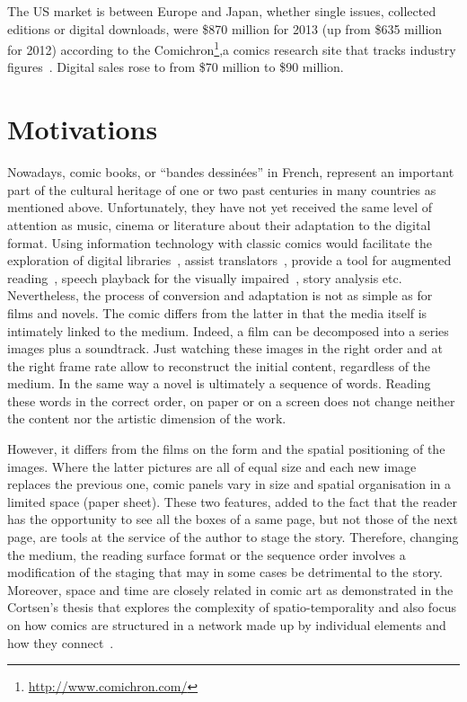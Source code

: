 The US market is between Europe and Japan, whether single issues, collected editions or digital downloads, were \$870 million for 2013 (up from \$635 million for 2012) according to the Comichron\footnote{\url{http://www.comichron.com/}},a comics research site that tracks industry figures~\cite{Miller2014}.
Digital sales rose to from \$70 million to \$90 million.

\section{Motivations} %
\label{ssub:motivations}

Nowadays, comic books, or ``bandes dessin{\'e}es'' in French, represent an important part of the cultural heritage of one or two past centuries in many countries as mentioned above.
Unfortunately, they have not yet received the same level of attention as music, cinema or literature about their adaptation to the digital format.
Using information technology with classic comics would facilitate the exploration of digital libraries~\cite{Back2001}, assist translators~\cite{borodo2014multimodality}, provide a tool for augmented reading~\cite{Singh2004,Raulet2013Comics}, speech playback for the visually impaired~\cite{Brandon2014,Ponsard09}, story analysis etc.
Nevertheless, the process of conversion and adaptation is not as simple as for films and novels.
The comic differs from the latter in that the media itself is intimately linked to the medium.
Indeed, a film can be decomposed into a series images plus a soundtrack.
Just watching these images in the right order and at the right frame rate allow to reconstruct the initial content, regardless of the medium. 
In the same way a novel is ultimately a sequence of words.
Reading these words in the correct order, on paper or on a screen does not change neither the content nor the artistic dimension of the work.

However, it differs from the films on the form and the spatial positioning of the images.
Where the latter pictures are all of equal size and each new image replaces the previous one, comic panels vary in size and spatial organisation in a limited space (paper sheet).
These two features, added to the fact that the reader has the opportunity to see all the boxes of a same page, but not those of the next page, are tools at the service of the author to stage the story.
Therefore, changing the medium, the reading surface format or the sequence order involves a modification of the staging that may in some cases be detrimental to the story.
Moreover, space and time are closely related in comic art as demonstrated in the Cortsen's thesis that explores the complexity of spatio-temporality and also focus on how comics are structured in a network made up by individual elements and how they connect~\cite{Cortsen2012Comics}.

